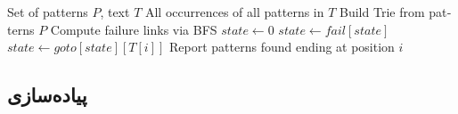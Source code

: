 \documentclass{matinbook}
\begin{document}
    \begin{latin}
        \begin{algorithm}
            \begin{algorithmic}[1]
                \Require Set of patterns $P$, text $T$
                \Ensure All occurrences of all patterns in $T$
                \State Build Trie from patterns $P$
                \State Compute failure links via BFS
                \State $state \gets 0$
                \State $state \gets fail[state]$
                \EndWhile
                \State $state \gets goto[state][T[i]]$
                \State Report patterns found ending at position $i$
                \EndIf
                \EndFor
            \end{algorithmic}
        \end{algorithm}
    \end{latin}
    
    \subsection{پیاده‌سازی}
    
\end{document}
